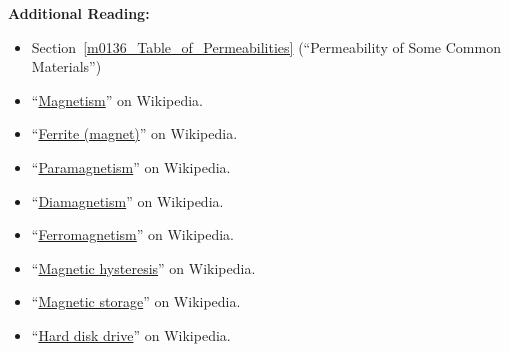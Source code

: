 {\bf Additional Reading:}
\begin{itemize}
\item Section~\ref{m0136_Table_of_Permeabilities} (``Permeability of Some Common Materials'')
\item ``\href{https://en.wikipedia.org/wiki/Magnetism}{Magnetism}'' on Wikipedia.
\item ``\href{https://en.wikipedia.org/wiki/Ferrite_(magnet)}{Ferrite (magnet)}'' on Wikipedia.
\item ``\href{https://en.wikipedia.org/wiki/Paramagnetism}{Paramagnetism}'' on Wikipedia.
\item ``\href{https://en.wikipedia.org/wiki/Diamagnetism}{Diamagnetism}'' on Wikipedia.
\item ``\href{https://en.wikipedia.org/wiki/Ferromagnetism}{Ferromagnetism}'' on Wikipedia.
\item ``\href{https://en.wikipedia.org/wiki/Magnetic_hysteresis}{Magnetic hysteresis}'' on Wikipedia.
\item ``\href{https://en.wikipedia.org/wiki/Magnetic_storage}{Magnetic storage}'' on Wikipedia.
\item ``\href{https://en.wikipedia.org/wiki/Hard_disk_drive}{Hard disk drive}'' on Wikipedia.
\end{itemize}

